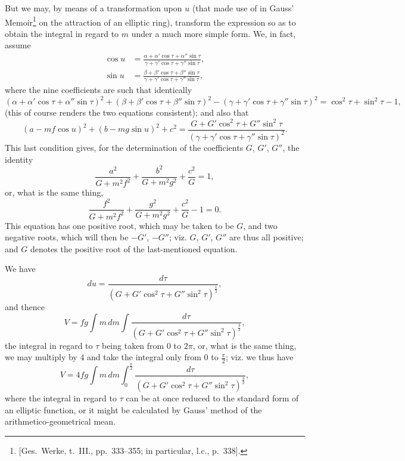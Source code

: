 \documentclass[11pt,a4paper]{book}
\begin{document}
\begin{art}
But we may, by means of a transformation upon $u$ (that made use of in Gauss' Memoir\footnote{[Ges.\ Werke, t.~III., pp.~333--355; in particular, l.c., p.~338].} on the attraction of an elliptic ring), transform the expression so as to obtain the integral in regard to $m$ under a much more simple form. We, in fact, assume
\begin{align*}
\cos u &= \frac{\alpha + \alpha'\cos\tau + \alpha''\sin\tau}{\gamma + \gamma'\cos\tau + \gamma''\sin\tau}, \\
\sin u &= \frac{\beta + \beta'\cos\tau + \beta''\sin\tau}{\gamma + \gamma'\cos\tau + \gamma''\sin\tau},
\end{align*}
where the nine coefficients are such that identically
\[
(\alpha + \alpha'\cos\tau + \alpha''\sin\tau)^2 + (\beta + \beta'\cos\tau + \beta''\sin\tau)^2 - (\gamma + \gamma'\cos\tau + \gamma''\sin\tau)^2 = \cos^2\tau + \sin^2\tau - 1,
\]
(this of course renders the two equations consistent); and also that
\[
(a - mf\cos u)^2 + (b - mg\sin u)^2 + c^2 = \frac{G + G'\cos^2\tau + G''\sin^2\tau}{(\gamma + \gamma'\cos\tau + \gamma''\sin\tau)^2}.
\]
This last condition gives, for the determination of the coefficients $G$, $G'$, $G''$, the identity
\[
\frac{a^2}{G + m^2f^2} + \frac{b^2}{G + m^2g^2} + \frac{c^2}{G} = 1,
\]
or, what is the same thing,
\[
\frac{f^2}{G + m^2f^2} + \frac{g^2}{G + m^2g^2} + \frac{c^2}{G} - 1 = 0.
\]
This equation has one positive root, which may be taken to be $G$, and two negative roots, which will then be $-G'$, $-G''$; viz. $G$, $G'$, $G''$ are thus all positive; and $G$ denotes the positive root of the last-mentioned equation.
\end{art}

\begin{art}
We have
\[ du = \frac{d\tau}{(G + G'\cos^2\tau + G''\sin^2\tau)^{\frac{1}{2}}}, \]
and thence
\[
V = fg\int m\,dm\int \frac{d\tau}{(G + G'\cos^2\tau + G''\sin^2\tau)^{\frac{3}{2}}},
\]
the integral in regard to $\tau$ being taken from $0$ to $2\pi$, or, what is the same thing, we may multiply by $4$ and take the integral only from $0$ to $\frac{\pi}{2}$; viz. we thus have
\[
V = 4fg\int m\,dm\int_0^{\frac{\pi}{2}} \frac{d\tau}{(G + G'\cos^2\tau + G''\sin^2\tau)^{\frac{3}{2}}},
\]
where the integral in regard to $\tau$ can be at once reduced to the standard form of an elliptic function, or it might be calculated by Gauss' method of the arithmetico-geometrical mean.
\end{art}
\end{document}
